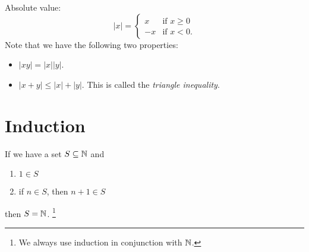 \begin{example}
  Absolute value:
  \[
    |x| =
    \begin{cases}
      x & \text{if $x \ge 0$} \\
      -x & \text{if $x < 0$}.
    \end{cases}
  \]
  Note that we have the following two properties:
  \begin{itemize}
    \item $|xy| = |x||y|$.
    \item $|x + y| \le |x| + |y|$. This is called the
      \textit{triangle inequality}.
  \end{itemize}
\end{example}

\section{Induction}
If we have a set $S \subseteq \mathbb{N}$ and
\begin{enumerate}
  \item $1 \in S$
  \item if $n \in S$, then $n + 1 \in S$
\end{enumerate}
then $S = \mathbb{N}$.
\footnote{We always use induction in conjunction with
$\mathbb{N}$.}
